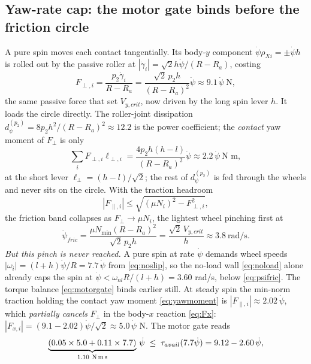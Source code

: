 \documentclass[11pt]{article}
\begin{document}
\subsection{Yaw-rate cap: the motor gate binds before the friction circle}
A pure spin moves each contact tangentially. Its body-$y$ component $\dot\psi\rho_{Xi}=\pm\dot\psi h$
is rolled out by the passive roller at $|\dot\gamma_i|=\sqrt2 h\dot\psi/(R-R_a)$, costing
\begin{equation}
F_{\perp,i}=\frac{p_2\dot\gamma_i}{R-R_a}=\frac{\sqrt2\,p_2h}{(R-R_a)^2}\dot\psi\approx9.1\,\dot\psi\ \text{N},
\end{equation}
the same passive force that set $V_{y,crit}$, now driven by the long spin lever $h$. It loads the
circle directly. The roller-joint dissipation $d_\psi^{(p_2)}=8p_2h^2/(R-R_a)^2\approx12.2$ is the
power coefficient; the \emph{contact} yaw moment of $F_\perp$ is only
\begin{equation}
\sum_iF_{\perp,i}\ell_{\perp,i}=\frac{4p_2h(h-l)}{(R-R_a)^2}\dot\psi\approx2.2\,\dot\psi\ \text{N m},
\label{eq:yawmoment}
\end{equation}
at the short lever $\ell_\perp=(h-l)/\sqrt2$; the rest of $d_\psi^{(p_2)}$ is fed through the wheels
and never sits on the circle. With the traction headroom
\begin{equation}
|F_{\parallel,i}|\le\sqrt{(\mu N_i)^2-F_{\perp,i}^2},
\label{eq:headroom}
\end{equation}
the friction band collapses as $F_\perp\to\mu N_i$, the lightest wheel pinching first at
\begin{equation}
\dot\psi_{fric}=\frac{\mu N_{\min}(R-R_a)^2}{\sqrt2\,p_2h}=\frac{\sqrt2\,V_{y,crit}}{h}\approx3.8\ \text{rad/s}.
\label{eq:psifric}
\end{equation}
\emph{But this pinch is never reached.} A pure spin at rate $\dot\psi$ demands wheel speeds
$|\omega_i|=(l+h)\dot\psi/R=7.7\,\dot\psi$ from \eqref{eq:noslip}, so the no-load wall
\eqref{eq:noload} alone already caps the spin at
$\dot\psi<\omega_{nl}R/(l+h)=3.60$ rad/s, below \eqref{eq:psifric}. The torque balance
\eqref{eq:motorgate} binds earlier still. At steady spin the min-norm traction holding the
contact yaw moment \eqref{eq:yawmoment} is $|F_{\parallel,i}|\approx2.02\,\dot\psi$, which
\emph{partially cancels} $F_\perp$ in the body-$x$ reaction \eqref{eq:Fx}:
$|F_{x,i}|=(9.1-2.02)\dot\psi/\sqrt2\approx5.0\,\dot\psi$ N. The motor gate reads
\begin{equation}
\underbrace{(0.05\times5.0+0.11\times7.7)}_{1.10\ \text{N\,m\,s}}\,\dot\psi
\;\le\;\tau_{avail}(7.7\dot\psi)=9.12-2.60\,\dot\psi,
\end{equation}
\end{document}

